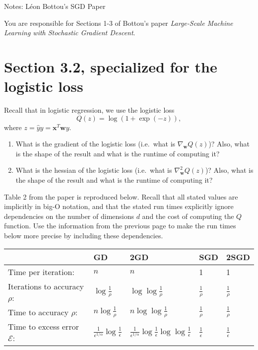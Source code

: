 \documentclass[10pt]{exam}
\theoremstyle{definition}
\newcommand{\trans}[1]{{#1}^{T}}
\newcommand{\w}{\mathbf w}
\newcommand{\x}{\mathbf x}
\begin{document}
\begin{center}
{
\Huge
Notes: L\'eon Bottou's SGD Paper
}
\end{center}

You are responsible for Sections 1-3 of Bottou's paper \emph{Large-Scale Machine Learning with Stochastic Gradient Descent}.

\section*{Section 3.2, specialized for the logistic loss}

Recall that in logistic regression, we use the logistic loss
\begin{equation}
    Q(z) = \log(1+\exp(-z))
    ,
\end{equation}
where $z = \hat y y = \trans \x \w y$.

\begin{enumerate}
    \item
        What is the gradient of the logistic loss (i.e.\ what is $\nabla_\w Q(z)$)?
        Also, what is the shape of the result and what is the runtime of computing it?
        \vspace{3in}

    \item
        What is the hessian of the logistic loss (i.e.\ what is $\nabla_\w^2 Q(z)$)?
        Also, what is the shape of the result and what is the runtime of computing it?
        \vspace{3in}
\end{enumerate}

\noindent
Table 2 from the paper is reproduced below.
Recall that all stated values are implicitly in big-O notation,
and that the stated run times explicitly ignore dependencies on the number of dimensions $d$ and the cost of computing the $Q$ function.
Use the information from the previous page to make the run times below more precise by including these dependencies.

\vspace{0.15in}
\begin{center}
    \renewcommand*{\arraystretch}{3}
    \begin{tabular}{lC{1in}C{1in}C{1in}C{1in}}
    \toprule
    & GD & 2GD & SGD & 2SGD \\
    \midrule
    Time per iteration: & $n$ & $n$ & 1 & 1 \\
    Iterations to accuracy $\rho$: & $\log\tfrac 1 \rho$ & $\log\log\tfrac 1 \rho$ & $\tfrac1\rho$  & $\tfrac1\rho$  \\
    Time to accuracy $\rho$: & $n\log\tfrac1\rho$ & $n\log\log\tfrac 1 \rho$ & $\tfrac 1\rho$ & $\tfrac 1\rho$ \\
    Time to excess error $\mathcal E$: & $\tfrac 1 {\epsilon^{1/\alpha}} \log \tfrac 1\epsilon$ & $\tfrac1{\epsilon^{1/\alpha}}\log\tfrac 1 \epsilon \log\log \tfrac 1 \epsilon$ & $\tfrac 1 \epsilon$ & $\tfrac 1 \epsilon$ \\
    \bottomrule
\end{tabular}
\end{center}
\end{document}
